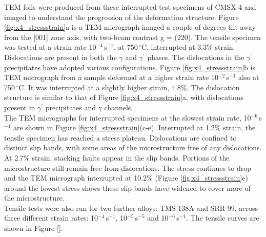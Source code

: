 \documentclass[a4paper,12pt,times,numbered,print,index]{Classes/PhDThesisPSnPDF}
\begin{document}
TEM foils were produced from these interrupted test specimens of CMSX-4 and imaged to understand the progression of the deformation structure. Figure \ref{fig:x4_stressstrain}a is a TEM micrograph imaged a couple of degrees tilt away from the [001] zone axis, with two-beam contrast g = (220). The tensile specimen was tested at a strain rate 10$^{-4}$\,s$^{-1}$, at 750\,$^\circ$C, interrupted at 3.3\% strain. Dislocations are present in both the $\gamma$ and $\gamma^\prime$ phases. The dislocations in the $\gamma^\prime$ precipitates have adopted various configurations. Figure \ref{fig:x4_stressstrain}b is TEM micrograph from a sample deformed at a higher strain rate 10$^{-2}$\,s$^{-1}$ also at 750\,$^\circ$C. It was interrupted at a slightly higher strain, 4.8\%. The dislocation structure is similar to that of Figure \ref{fig:x4_stressstrain}a, with dislocations present in $\gamma^\prime$ precipitates and $\gamma$ channels.\\
The TEM micrographs for interrupted specimens at the slowest strain rate, 10$^{-6}$\,s$^{-1}$ are shown in Figure \ref{fig:x4_stressstrain}(c-e). Interrupted at 1.2\% strain, the tensile specimen has reached a stress plateau. Dislocations are confined to distinct slip bands, with some areas of the microstructure free of any dislocations. At 2.7\% strain, stacking faults appear in the slip bands. Portions of the microstructure still remain free from dislocations. The stress continues to drop and the TEM micrograph interrupted at 10.2\% (Figure \ref{fig:x4_stressstrain}e) around the lowest stress shows these slip bands have widened to cover more of the microstructure.\\%
Tensile tests were also run for two further alloys: TMS-138A and SRR-99, across three different strain rates: 10$^{-4}$\,s$^{-1}$, 10$^{-5}$\,s$^{-5}$ and 10$^{-6}$\,s$^{-1}$. The tensile curves are shown in Figure \ref{}. 
\end{document}
